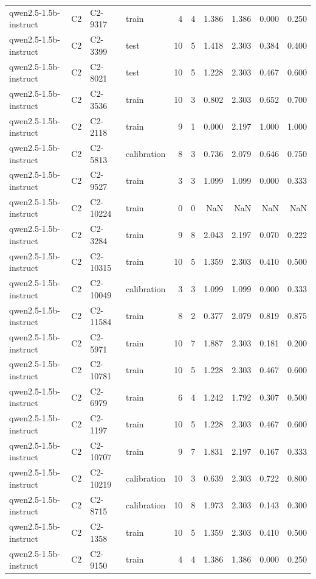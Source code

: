 \begin{table}
\begin{tabular}{llllrrrrrr}
qwen2.5-1.5b-instruct & C2 & C2-9317 & train & 4 & 4 & 1.386 & 1.386 & 0.000 & 0.250 \\
qwen2.5-1.5b-instruct & C2 & C2-3399 & test & 10 & 5 & 1.418 & 2.303 & 0.384 & 0.400 \\
qwen2.5-1.5b-instruct & C2 & C2-8021 & test & 10 & 5 & 1.228 & 2.303 & 0.467 & 0.600 \\
qwen2.5-1.5b-instruct & C2 & C2-3536 & train & 10 & 3 & 0.802 & 2.303 & 0.652 & 0.700 \\
qwen2.5-1.5b-instruct & C2 & C2-2118 & train & 9 & 1 & 0.000 & 2.197 & 1.000 & 1.000 \\
qwen2.5-1.5b-instruct & C2 & C2-5813 & calibration & 8 & 3 & 0.736 & 2.079 & 0.646 & 0.750 \\
qwen2.5-1.5b-instruct & C2 & C2-9527 & train & 3 & 3 & 1.099 & 1.099 & 0.000 & 0.333 \\
qwen2.5-1.5b-instruct & C2 & C2-10224 & train & 0 & 0 & NaN & NaN & NaN & NaN \\
qwen2.5-1.5b-instruct & C2 & C2-3284 & train & 9 & 8 & 2.043 & 2.197 & 0.070 & 0.222 \\
qwen2.5-1.5b-instruct & C2 & C2-10315 & train & 10 & 5 & 1.359 & 2.303 & 0.410 & 0.500 \\
qwen2.5-1.5b-instruct & C2 & C2-10049 & calibration & 3 & 3 & 1.099 & 1.099 & 0.000 & 0.333 \\
qwen2.5-1.5b-instruct & C2 & C2-11584 & train & 8 & 2 & 0.377 & 2.079 & 0.819 & 0.875 \\
qwen2.5-1.5b-instruct & C2 & C2-5971 & train & 10 & 7 & 1.887 & 2.303 & 0.181 & 0.200 \\
qwen2.5-1.5b-instruct & C2 & C2-10781 & train & 10 & 5 & 1.228 & 2.303 & 0.467 & 0.600 \\
qwen2.5-1.5b-instruct & C2 & C2-6979 & train & 6 & 4 & 1.242 & 1.792 & 0.307 & 0.500 \\
qwen2.5-1.5b-instruct & C2 & C2-1197 & train & 10 & 5 & 1.228 & 2.303 & 0.467 & 0.600 \\
qwen2.5-1.5b-instruct & C2 & C2-10707 & train & 9 & 7 & 1.831 & 2.197 & 0.167 & 0.333 \\
qwen2.5-1.5b-instruct & C2 & C2-10219 & calibration & 10 & 3 & 0.639 & 2.303 & 0.722 & 0.800 \\
qwen2.5-1.5b-instruct & C2 & C2-8715 & calibration & 10 & 8 & 1.973 & 2.303 & 0.143 & 0.300 \\
qwen2.5-1.5b-instruct & C2 & C2-1358 & train & 10 & 5 & 1.359 & 2.303 & 0.410 & 0.500 \\
qwen2.5-1.5b-instruct & C2 & C2-9150 & train & 4 & 4 & 1.386 & 1.386 & 0.000 & 0.250 \\

\end{tabular}
\end{table}
